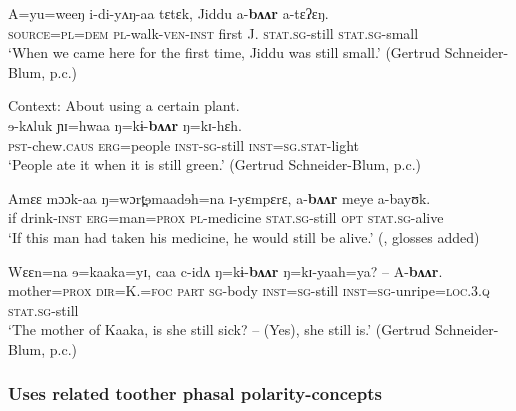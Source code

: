 \begin{exe}
	\ex\label{exAppendixTima1}
	\gll A=yu=weeŋ i-di-yʌŋ-aa tɛtɛk, Jiddu	a-\textbf{bʌʌr} a-tɛʔɛŋ.\\
	\textsc{source}=\textsc{pl}=\textsc{dem} \textsc{pl}-walk-\textsc{ven}-\textsc{inst} first J. \textsc{stat}.\textsc{sg}-still \textsc{stat}.\textsc{sg}-small\\
	\glt \lq When we came here for the first time, Jiddu was still small.\rq{ }(Gertrud Schneider-Blum, p.c.)
	
	\ex\label{exAppendixTima2}
	Context: About using a certain plant.\\
	\gll ɘ-kʌluk	ɲɪ=hwaa	ŋ=kɨ-\textbf{bʌʌr} ŋ=kɪ-hɛh.\\
	\textsc{pst}-chew.\textsc{caus} \textsc{erg}=people \textsc{inst}-\textsc{sg}-still \textsc{inst}=\textsc{sg}.\textsc{stat}-light\\
	\glt \lq People ate it when it is still green.\rq{ }(Gertrud Schneider-Blum, p.c.)	
	
	\ex\label{exAppendixTima3}
	\gll Amɛɛ mɔɔk-aa ŋ=wɔrt̪ɘmaadɘh=na ɪ-yɛmpɛrɛ, a-\textbf{bʌʌr} meye a-bayʊk.\\
	if drink-\textsc{inst} \textsc{erg}=man=\textsc{prox} \textsc{pl}-medicine \textsc{stat}.\textsc{sg}-still \textsc{opt} \textsc{stat}.\textsc{sg}-alive\\
	\glt \lq If this man had taken his medicine, he would still be alive.\rq{ }(\cite[33]{SchneiderBlum2013}, glosses added)
	
	\ex\label{exAppendixTima4}
	\gll Wɛɛn=na ɘ=kaaka=yɪ,	 caa c-idʌ ŋ=kɨ-\textbf{bʌʌr} ŋ=kɪ-yaah=ya? – A-\textbf{bʌʌr}.\\
	mother=\textsc{prox} \textsc{dir}=K.=\textsc{foc} \textsc{part} \textsc{sg}-body \textsc{inst}=\textsc{sg}-still \textsc{inst}=\textsc{sg}-unripe=\textsc{loc}.3.\textsc{q} {} \textsc{stat}.\textsc{sg}-still\\
	\glt \lq{}The mother of Kaaka, is she still sick? -- (Yes), she still is.\rq{ }(Gertrud Schneider-Blum, p.c.)
\end{exe}

\subsubsection{Uses related toother phasal polarity-concepts}
